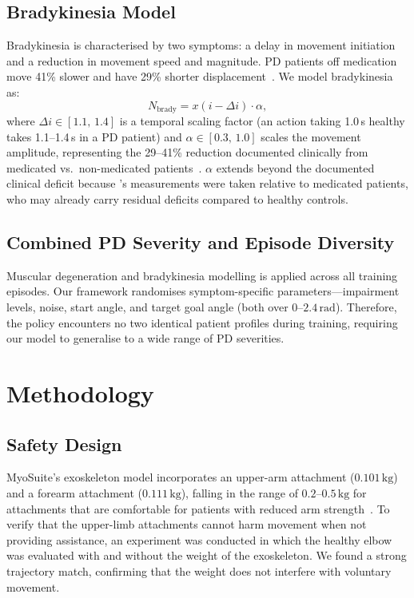 \documentclass[letterpaper]{article} %
\begin{document}
\subsection{Bradykinesia Model}

Bradykinesia is characterised by two symptoms: a delay in movement initiation
and a reduction in movement speed and magnitude.
PD patients off medication move 41\% slower and have 29\% shorter
displacement~\citep{agostino2015}.
We model bradykinesia as:
\begin{equation}
  N_\text{brady} = x(i - \Delta i) \cdot \alpha,
  \label{eq:bradykinesia}
\end{equation}
where $\Delta i\in[1.1,\,1.4]$ is a temporal scaling factor (an action
taking 1.0\,s healthy takes 1.1--1.4\,s in a PD patient) and
$\alpha\in[0.3,\,1.0]$ scales the movement amplitude, representing the
29--41\% reduction documented clinically from medicated vs.\ non-medicated
patients~\citep{agostino2015, raethjen2018}.
$\alpha$ extends beyond the documented clinical deficit because
\citeauthor{agostino2015}'s measurements were taken relative to medicated
patients, who may already carry residual deficits compared to healthy controls.

\subsection{Combined PD Severity and Episode Diversity}

Muscular degeneration and bradykinesia modelling is applied across all training
episodes.
Our framework randomises symptom-specific parameters---impairment levels,
noise, start angle, and target goal angle (both over $0$--$2.4\,\mathrm{rad}$).
Therefore, the policy encounters no two identical patient profiles during
training, requiring our model to generalise to a wide range of PD severities.

\section{Methodology}
\label{sec:method}

\subsection{Safety Design}
\label{sec:safety}

MyoSuite's exoskeleton model incorporates an upper-arm attachment
($0.101\,\mathrm{kg}$) and a forearm attachment ($0.111\,\mathrm{kg}$), falling
in the range of $0.2$--$0.5\,\mathrm{kg}$ for attachments that are comfortable
for patients with reduced arm strength~\citep{pmc11852623, pmc12451468}.
To verify that the upper-limb attachments cannot harm movement when not providing
assistance, an experiment was conducted in which the healthy elbow was evaluated
with and without the weight of the exoskeleton.
We found a strong trajectory match, confirming that the weight does not interfere
with voluntary movement.
\end{document}
